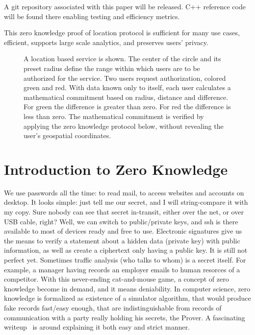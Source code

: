 \documentclass{article}
\begin{document}
A git repository associated with this paper will be released. C++ reference code will be found there enabling testing and efficiency metrics. 

This zero knowledge proof of location protocol is sufficient for many use cases, efficient, supports large scale analytics, and preserves users' privacy.

\begin{figure}
  \centering
  \def\svgwidth{\columnwidth}
  
\caption{A location based service is shown.
The center of the circle and its preset radius define the range within which users are to be authorized for the service.
Two users request authorization, colored green and red.
With data known only to itself, each user calculates a mathematical commitment based on radius, distance and difference.
For green the difference is greater than zero.
For red the difference is less than zero.
The mathematical commitment is verified by applying the zero knowledge protocol below, without revealing the user's geospatial coordinates.}
\label{fig-rangeproof}
\end{figure}

\section{Introduction to Zero Knowledge}

We use passwords all the time: to read mail, to access websites and accounts on desktop.
It looks simple: just tell me our secret, and I will string-compare it with my copy.
Sure nobody can see that secret in-transit, either over the net, or over USB cable, right?
Well, we can switch to public/private keys, and ssh is there available to most of devices ready and free to use.
Electronic signatures give us the means to verify a statement about a hidden data (private key)
with public information, as well as create a ciphertext only having a public key.
It is still not perfect yet. Sometimes traffic analysis (who talks to whom) is a secret itself.
For example, a manager having records an employer emails to human resorces of a competitor.
With this never-ending cat-and-mouse game, a concept of zero knowledge become in demand,
and it means deniability.
In computer science, zero knowledge is formalized as existence of a simulator algorithm,
that would produce fake records fast/easy enough,
that are indistinguishable from records of communication with a party really holding his secrets, the Prover.
A fascinating writeup~\cite{Quisquater89} is around explaining it both easy and strict manner.
\end{document}
